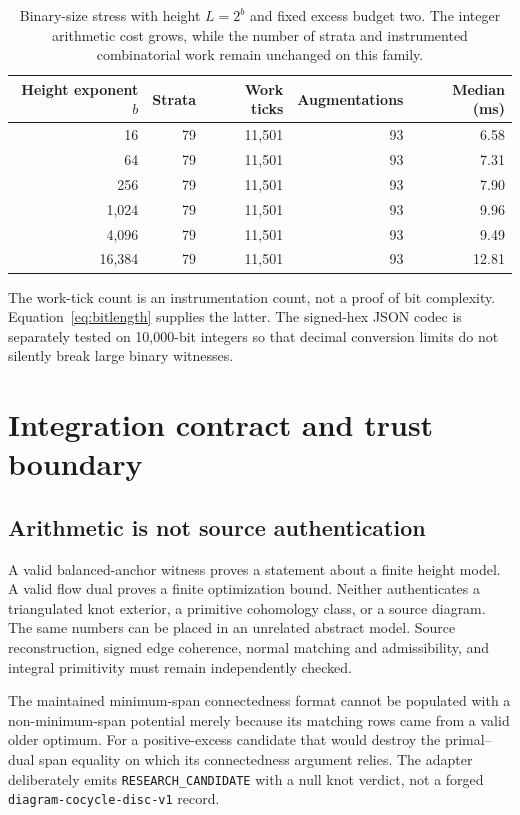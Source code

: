 \documentclass[11pt,letterpaper]{article}
\theoremstyle{definition}
\begin{document}
\begin{table}[htbp]
\centering\small
\begin{tabular}{rrrrr}
\toprule
Height exponent $b$ & Strata & Work ticks & Augmentations & Median (ms)\\
\midrule
16 & 79 & 11,501 & 93 & 6.58\\
64 & 79 & 11,501 & 93 & 7.31\\
256 & 79 & 11,501 & 93 & 7.90\\
1,024 & 79 & 11,501 & 93 & 9.96\\
4,096 & 79 & 11,501 & 93 & 9.49\\
16,384 & 79 & 11,501 & 93 & 12.81\\
\bottomrule
\end{tabular}
\caption{Binary-size stress with height $L=2^b$ and fixed excess budget two. The integer arithmetic cost grows, while the number of strata and instrumented combinatorial work remain unchanged on this family.}
\label{tab:binary}
\end{table}

The work-tick count is an instrumentation count, not a proof of bit complexity. Equation~\eqref{eq:bitlength} supplies the latter. The signed-hex JSON codec is separately tested on 10,000-bit integers so that decimal conversion limits do not silently break large binary witnesses.

\section{Integration contract and trust boundary}\label{sec:integration}

\subsection{Arithmetic is not source authentication}
A valid balanced-anchor witness proves a statement about a finite height model. A valid flow dual proves a finite optimization bound. Neither authenticates a triangulated knot exterior, a primitive cohomology class, or a source diagram. The same numbers can be placed in an unrelated abstract model. Source reconstruction, signed edge coherence, normal matching and admissibility, and integral primitivity must remain independently checked.

The maintained minimum-span connectedness format cannot be populated with a non-minimum-span potential merely because its matching rows came from a valid older optimum. For a positive-excess candidate that would destroy the primal--dual span equality on which its connectedness argument relies. The adapter deliberately emits \texttt{RESEARCH\_CANDIDATE} with a null knot verdict, not a forged \texttt{diagram-cocycle-disc-v1} record.
\end{document}
